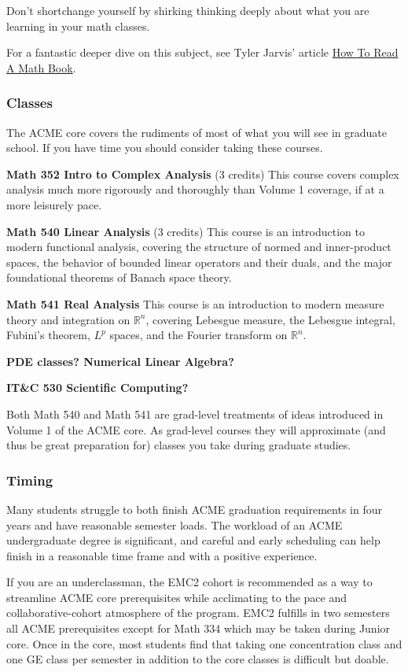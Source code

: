 \documentclass[11pt]{article}
\begin{document}
Don't shortchange yourself by shirking thinking deeply about what you are learning in your math classes.

For a fantastic deeper dive on this subject, see Tyler Jarvis' article \href{https://mathdept.byu.edu/~jarvis/AdviceForStudents/HowToReadAMathBook.pdf}{How To Read A Math Book}.

\subsubsection*{Classes}
The ACME core covers the rudiments of most of what you will see in graduate school. If you have time you should consider taking these courses.

\textbf{Math 352 Intro to Complex Analysis} (3 credits) This course covers complex analysis much more rigorously and thoroughly than Volume 1 coverage, if at a more leisurely pace.

\textbf{Math 540 Linear Analysis} (3 credits) This course is an introduction to modern functional analysis, covering the structure of normed and inner-product spaces, the behavior of bounded linear operators and their duals, and the major foundational theorems of Banach space theory.

\textbf{Math 541 Real Analysis} This course is an introduction to modern measure theory and integration on $\mathbb{R}^n$, covering Lebesgue measure, the Lebesgue integral, Fubini’s theorem, $L^p$ spaces, and the Fourier transform on $\mathbb{R}^n$.

\textbf{PDE classes? Numerical Linear Algebra?}

\textbf{IT\&C 530 Scientific Computing?}

Both Math 540 and Math 541 are grad-level treatments of ideas introduced in Volume 1 of the ACME core. As grad-level courses they will approximate (and thus be great preparation for) classes you take during graduate studies.

\subsubsection*{Timing}
Many students struggle to both finish ACME graduation requirements in four years and have reasonable semester loads. The workload of an ACME undergraduate degree is significant, and careful and early scheduling can help finish in a reasonable time frame and with a positive experience.

If you are an underclassman, the EMC2 cohort is recommended as a way to streamline ACME core prerequisites while acclimating to the pace and collaborative-cohort atmosphere of the program. EMC2 fulfills in two semesters all ACME prerequisites except for Math 334 which may be taken during Junior core. Once in the core, most students find that taking one concentration class and one GE class per semester in addition to the core classes is difficult but doable. 
\end{document}
